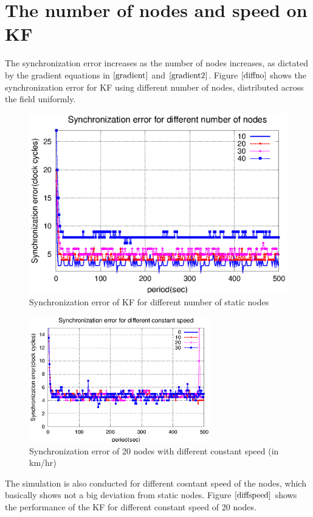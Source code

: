 \documentclass[a4paper,10pt]{report}
\begin{document}
\section{\textbf{The number of nodes and speed on KF}}
The synchronization error increases as the number of nodes increases, as dictated by the gradient equations in $\cite{gradient}$ and $\cite{gradient2}$. Figure $\ref{diffno}$ shows the synchronization error for KF using different number of nodes, distributed across the field uniformly.
\begin{figure}[!h]
\centering
\includegraphics[width= 0.7 \textwidth]{diffno}
\caption{Synchronization error of KF for different number of static nodes}
\label{diffno}
\end{figure}
\begin{figure}[!h]
\centering
\includegraphics[width = 0.7\textwidth]{diffspeed}
\caption{Synchronization error of 20 nodes with different constant speed (in km/hr)}
\label{diffspeed}
\end{figure}
The simulation is also conducted for different cosntant speed of the nodes, which basically shows not a big deviation from static nodes. Figure $\ref{diffspeed}$ shows the performance of the KF for different constant speed of 20 nodes.
\end{document}
